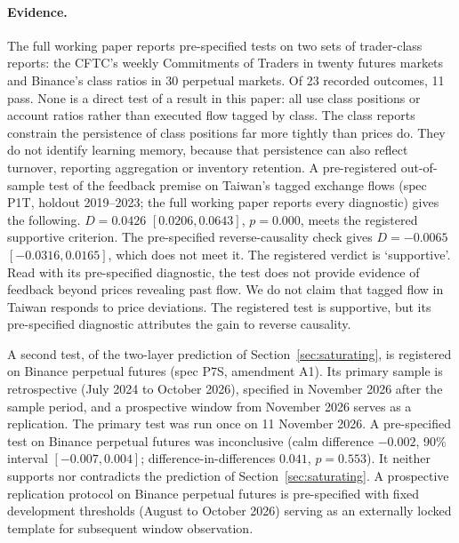 \documentclass[12pt]{article}
\theoremstyle{definition}
\theoremstyle{remark}
\begin{document}
\paragraph{Evidence.} The full working paper reports pre-specified tests on two sets of trader-class reports: the CFTC's weekly Commitments of Traders in twenty futures markets and Binance's class ratios in 30 perpetual markets. Of 23 recorded outcomes, 11 pass. None is a direct test of a result in this paper: all use class positions or account ratios rather than executed flow tagged by class. The class reports constrain the persistence of class positions far more tightly than prices do. They do not identify learning memory, because that persistence can also reflect turnover, reporting aggregation or inventory retention. A pre-registered out-of-sample test of the feedback premise on Taiwan's tagged exchange flows (spec P1T, holdout 2019--2023; the full working paper reports every diagnostic) gives the following. $D=0.0426$ $[0.0206, 0.0643]$, $p=0.000$, meets the registered supportive criterion. The pre-specified reverse-causality check gives $D=-0.0065$ $[-0.0316, 0.0165]$, which does not meet it. The registered verdict is `supportive'. Read with its pre-specified diagnostic, the test does not provide evidence of feedback beyond prices revealing past flow. We do not claim that tagged flow in Taiwan responds to price deviations. The registered test is supportive, but its pre-specified diagnostic attributes the gain to reverse causality.

A second test, of the two-layer prediction of Section~\ref{sec:saturating}, is registered on Binance perpetual futures (spec P7S, amendment A1). Its primary sample is retrospective (July 2024 to October 2026), specified in November 2026 after the sample period, and a prospective window from November 2026 serves as a replication. The primary test was run once on 11 November 2026. A pre-specified test on Binance perpetual futures was inconclusive (calm difference $-0.002$, 90\% interval $[-0.007, 0.004]$; difference-in-differences $0.041$, $p=0.553$). It neither supports nor contradicts the prediction of Section~\ref{sec:saturating}. A prospective replication protocol on Binance perpetual futures is pre-specified with fixed development thresholds (August to October 2026) serving as an externally locked template for subsequent window observation.
\end{document}
